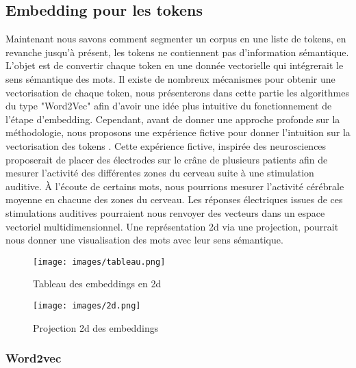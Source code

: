 \documentclass[12pt]{article}
\theoremstyle{definition}
\begin{document}
	
	\subsection{Embedding pour les tokens}

	Maintenant nous savons comment segmenter un corpus en une liste de tokens, en revanche jusqu'à présent, les tokens ne contiennent pas d'information sémantique. L'objet est de convertir chaque token en une donnée vectorielle qui intégrerait le sens sémantique des mots. Il existe de nombreux mécanismes pour obtenir une vectorisation de chaque token, nous présenterons dans cette partie les algorithmes du type "Word2Vec" afin d'avoir une idée plus intuitive du fonctionnement de l'étape d'embedding. Cependant, avant de donner une approche profonde sur la méthodologie, nous proposons une expérience fictive pour donner l'intuition sur la vectorisation des tokens \cite{video_embedding}. Cette expérience fictive, inspirée des neurosciences proposerait de placer des électrodes sur le crâne de plusieurs patients afin de mesurer l’activité des différentes zones du cerveau suite à une stimulation auditive. À l’écoute de certains mots, nous pourrions mesurer l’activité cérébrale moyenne en chacune des zones du cerveau. Les réponses électriques issues de ces stimulations auditives pourraient nous renvoyer des vecteurs dans un espace vectoriel multidimensionnel. Une représentation 2d via une projection, pourrait nous donner une visualisation des mots avec leur sens sémantique. \\[1cm] 
	

\begin{figure}[!h]  %
	\centering
	\begin{minipage}[t]{0.45\textwidth}
		\centering
		\texttt{[image: images/tableau.png]}
		\caption{Tableau des embeddings en 2d}
	\end{minipage}\hfill
	\begin{minipage}[t]{0.45\textwidth}
		\centering
		\texttt{[image: images/2d.png]}
		\caption{Projection 2d des embeddings}
	\end{minipage}
\end{figure}







	\subsubsection{Word2vec}
	
\end{document}
